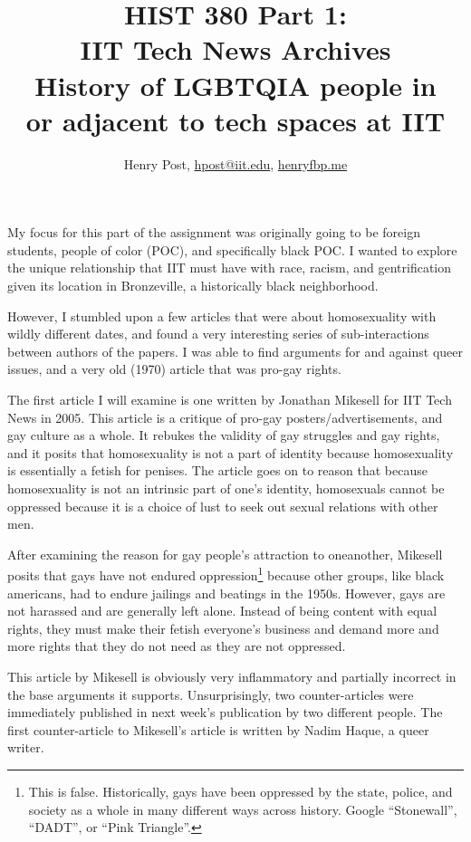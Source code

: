 \documentclass[a4paper,12pt]{article}
\title{HIST 380 Part 1: \\ IIT Tech News Archives \\ History of LGBTQIA people in \\ or adjacent to tech spaces at IIT}
\author{Henry Post, \url{hpost@iit.edu}, \url{henryfbp.me}}
\begin{document}
\maketitle

\newpage

	My focus for this part of the assignment was originally going to be foreign students, people of color (POC), and specifically black POC. I wanted to explore the unique relationship that IIT must have with race, racism, and gentrification given its location in Bronzeville, a historically black neighborhood. 

	However, I stumbled upon a few articles that were about homosexuality with wildly different dates, and found a very interesting series of sub-interactions between authors of the papers. I was able to find arguments for and against queer issues, and a very old (1970) article that was pro-gay rights.

	The first article \cite{antigay} I will examine is one written by Jonathan Mikesell for IIT Tech News in 2005. This article is a critique of pro-gay posters/advertisements, and gay culture as a whole. It rebukes the validity of gay struggles and gay rights, and it posits that homosexuality is not a part of identity because homosexuality is essentially a fetish for penises. The article goes on to reason that because homosexuality is not an intrinsic part of one's identity, homosexuals cannot be oppressed because it is a choice of lust to seek out sexual relations with other men.

	After examining the reason for gay people's attraction to oneanother, Mikesell posits that gays have not endured oppression\footnote{This is false. Historically, gays have been oppressed by the state, police, and society as a whole in many different ways across history. Google ``Stonewall'', ``DADT'', or ``Pink Triangle''.} because other groups, like black americans, had to endure jailings and beatings in the 1950s. However, gays are not harassed and are generally left alone. Instead of being content with equal rights, they must make their fetish everyone's business and demand more and more rights that they do not need as they are not oppressed.
	
	This article by Mikesell is obviously very inflammatory and partially incorrect in the base arguments it supports. Unsurprisingly, two counter-articles were immediately published in next week's publication by two different people.  The first counter-article to Mikesell's article is written by Nadim Haque\cite{counterantigay1}, a queer writer. 
	
\end{document}
